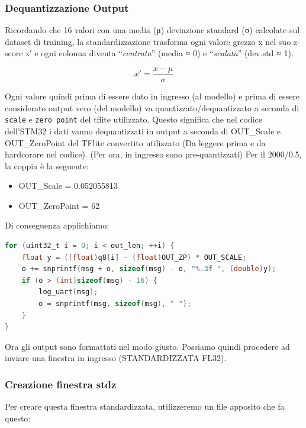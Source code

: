 \subsubsection{Dequantizzazione Output}

Ricordando che 16 valori con una media (μ) deviazione standard (σ) calcolate sul dataset di training, la standardizzazione trasforma ogni valore grezzo x nel suo z-score x′ e ogni colonna diventa “\textit{centrata}” (media ≈ 0) e “\textit{scalata}” (dev.std ≈ 1). 

\begin{equation}
x' = \frac{x - \mu}{\sigma}
\end{equation}

Ogni valore quindi prima di essere dato in ingresso (al modello) e prima di essere considerato output vero (del modello) va quantizzato/dequantizzato a seconda di \texttt{scale} e \texttt{zero point} del tflite utilizzato. 
Questo significa che nel codice dell'STM32 i dati vanno dequantizzati in output a seconda di OUT\_Scale e OUT\_ZeroPoint del TFlite convertito utilizzato (Da leggere prima e da hardcorare nel codice). (Per ora, in ingresso sono pre-quantizzati)
Per il 2000/0.5, la coppia è la seguente: 

\begin{itemize}
    \item OUT\_Scale = 0.052055813
    \item OUT\_ZeroPoint = 62
\end{itemize}
Di conseguenza applichiamo:

\begin{lstlisting}[language=C]
for (uint32_t i = 0; i < out_len; ++i) {
    float y = ((float)q8[i] - (float)OUT_ZP) * OUT_SCALE;
    o += snprintf(msg + o, sizeof(msg) - o, "%.3f ", (double)y);
    if (o > (int)sizeof(msg) - 16) {
        log_uart(msg);
        o = snprintf(msg, sizeof(msg), " ");
    }
}
\end{lstlisting}
Ora gli output sono formattati nel modo giusto. Possiamo quindi procedere ad inviare una finestra in ingresso (STANDARDIZZATA FL32). 

\subsubsection{Creazione finestra stdz}
Per creare questa finestra standardizzata, utilizzeremo un file apposito che fa questo:

